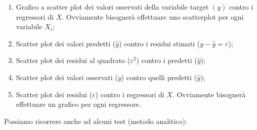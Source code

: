 \documentclass[a4page, 11pt]{article} %
\begin{document}
\begin{enumerate}[noitemsep]
\item Grafico a scatter plot dei valori osservati della variabile target $(y)$ contro i regressori di $X$. Ovviamente bisognerà effettuare uno scatterplot per ogni variabile $X_i$;
\item Scatter plot dei valori predetti ($\hat{y}$) contro i residui stimati ($y - \hat{y} = \varepsilon$);
\item Scatter plot dei residui al quadrato ($\varepsilon^2$) contro i predetti ($\hat{y}$);
\item Scatter plot dei valori osservati ($y$) contro quelli predetti ($\hat{y}$);
\item Scatter plot dei residui ($\varepsilon$) contro i regressori di $X$. Ovviamente bisognerà effettuare un grafico per ogni regressore.
\end{enumerate}
Possiamo ricorrere anche ad alcuni test (metodo analitico):
\end{document}
